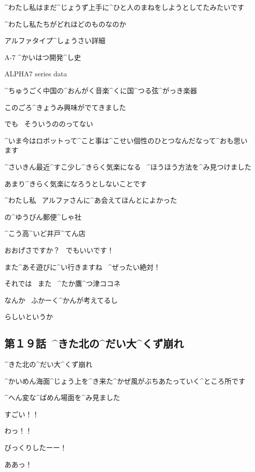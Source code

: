 \K ^{わたし}{私}はまだ^{じょうず}{上手}に^{ひと}{人}のまねをしようとしてたみたいです

\page
\K ^{わたし}{私}たちがどれほどのものなのか

\Sign アルファタイプ^{しょうさい}{詳細}

\Sign A-7 ^{かいはつ}{開発}^{し}{史}

\Sign ALPHA7 series data

\Sign ^{ちゅうごく}{中国}の^{おんがく}{音楽}^{くに}{国}^{つる}{弦}^{がっき}{楽器}

\page
\K このごろ^{きょうみ}{興味}がでてきました

\K でも
\ そういうののってない

\K ^{いま}{今}はロボットって^{こと}{事}は^{こせい}{個性}のひとつなんだなって^{おも}{思}います

\page
\K ^{さいきん}{最近}^{すこ}{少}し^{きらく}{気楽}になる
\ ^{ほうほう}{方法}を^{み}{見}つけました

\K あまり^{きらく}{気楽}になろうとしないことです

\page
\K ^{わたし}{私}
\ アルファさんに^{あ}{会}えてほんとによかった

\Sign の^{ゆうびん}{郵便}^{しゃ}{社}

\Sign ^{こう}{高}^{いど}{井戸}^{てん}{店}

\K おおげさですか？
\ でもいいです！

\page
\K また^{あそ}{遊}びに^{い}{行}きますね
\ ^{ぜったい}{絶対}！

\page
\K それでは
\ また
\ ^{たか}{鷹}^{つ}{津}ココネ

\A なんか
\ ふかーく^{かんが}{考}えてるし

\A らしいというか


\subsection{第１９話\ ^{きた}{北}の^{だい}{大}^{くず}{崩}れ}

\page[52]
\A ^{きた}{北}の^{だい}{大}^{くず}{崩}れ

\A ^{かいめん}{海面}^{じょう}{上}を^{き}{来}た^{かぜ}{風}がぶちあたっていく^{ところ}{所}です

\page
\A ^{へん}{変}な^{ばめん}{場面}を^{み}{見}ました

\page[55]
\A すごい！！

\Y わっ！！

\Y びっくりしたーー！

\A ああっ！

